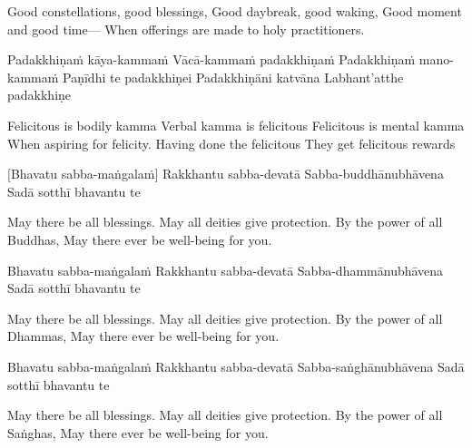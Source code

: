 \begin{english}
  Good constellations, good blessings,
  Good daybreak, good waking,
  Good moment and good time—
  When offerings are made to holy practitioners.
\end{english}

Padakkhiṇaṁ kāya-kammaṁ
Vācā-kammaṁ padakkhiṇaṁ
Padakkhiṇaṁ mano-kammaṁ
Paṇīdhi te padakkhiṇei
Padakkhiṇāni katvāna
Labhant’atthe padakkhiṇe

\begin{english}
  Felicitous is bodily kamma
  Verbal kamma is felicitous
  Felicitous is mental kamma
  When aspiring for felicity.
  Having done the felicitous
  They get felicitous rewards
\end{english}

\suttaRef{[AN 3.155]}

[Bhavatu sabba-maṅgalaṁ]
Rakkhantu sabba-devatā
Sabba-buddhānubhāvena
Sadā sotthī bhavantu te

\begin{english}
  May there be all blessings.
  May all deities give protection.
  By the power of all Buddhas,
  May there ever be well-being for you.
\end{english}

Bhavatu sabba-maṅgalaṁ
Rakkhantu sabba-devatā
Sabba-dhammānubhāvena
Sadā sotthī bhavantu te

\begin{english}
  May there be all blessings.
  May all deities give protection.
  By the power of all Dhammas,
  May there ever be well-being for you.
\end{english}

Bhavatu sabba-maṅgalaṁ
Rakkhantu sabba-devatā
Sabba-saṅghānubhāvena
Sadā sotthī bhavantu te

\begin{english}
  May there be all blessings.
  May all deities give protection.
  By the power of all Saṅghas,
  May there ever be well-being for you.
\end{english}

\suttaRef{[Trad]}

